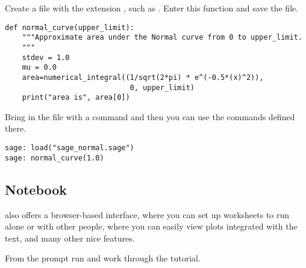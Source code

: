 Create a file with the extension , such as .
Enter this function and save the file.
\begin{lstlisting}[style=python]
def normal_curve(upper_limit):
    """Approximate area under the Normal curve from 0 to upper_limit.
    """
    stdev = 1.0
    mu = 0.0
    area=numerical_integral((1/sqrt(2*pi) * e^(-0.5*(x)^2)),
                             0, upper_limit)    
    print("area is", area[0])
\end{lstlisting}
Bring in the file with a  command
and then you can use the commands defined there.
\begin{lstlisting}[style=python]
sage: load("sage_normal.sage")
sage: normal_curve(1.0)   
\end{lstlisting}


\subsection{Notebook}
\Sage{} also offers a browser-based interface, where you can set up
worksheets to run alone or with other people, where you can easily
view plots integrated with the text, and many other nice features.

From the \Sage{} prompt run  and
work through the tutorial.
\endinput


TODO:
  1) how to use notebook to do exercises?